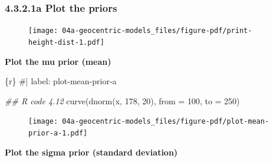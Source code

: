 \documentclass[
  letterpaper,
  DIV=11,
  numbers=noendperiod]{scrreprt}
\newenvironment{Shaded}{\begin{snugshade}}{\end{snugshade}}
\newcommand{\AttributeTok}[1]{\textcolor[rgb]{0.40,0.45,0.13}{#1}}
\newcommand{\CommentTok}[1]{\textcolor[rgb]{0.37,0.37,0.37}{#1}}
\newcommand{\ConstantTok}[1]{\textcolor[rgb]{0.56,0.35,0.01}{#1}}
\newcommand{\DecValTok}[1]{\textcolor[rgb]{0.68,0.00,0.00}{#1}}
\newcommand{\DocumentationTok}[1]{\textcolor[rgb]{0.37,0.37,0.37}{\textit{#1}}}
\newcommand{\FunctionTok}[1]{\textcolor[rgb]{0.28,0.35,0.67}{#1}}
\newcommand{\InformationTok}[1]{\textcolor[rgb]{0.37,0.37,0.37}{#1}}
\newcommand{\NormalTok}[1]{\textcolor[rgb]{0.00,0.23,0.31}{#1}}
\newcommand{\SpecialCharTok}[1]{\textcolor[rgb]{0.37,0.37,0.37}{#1}}
\begin{document}
\hypertarget{a-plot-the-priors}{%
\subsubsection{4.3.2.1a Plot the priors}\label{a-plot-the-priors}}

\begin{Shaded}
\end{Shaded}

\begin{figure}[H]

{\centering \texttt{[image: 04a-geocentric-models\_files/figure-pdf/print-height-dist-1.pdf]}

}

\end{figure}

\textbf{Plot the mu prior (mean)}

\begin{Shaded}
\begin{Highlighting}[]
\InformationTok{\textasciigrave{}\textasciigrave{}\textasciigrave{}\{r\}}
\CommentTok{\#| label: plot{-}mean{-}prior{-}a}

\DocumentationTok{\#\# R code 4.12}
\FunctionTok{curve}\NormalTok{(}\FunctionTok{dnorm}\NormalTok{(x, }\DecValTok{178}\NormalTok{, }\DecValTok{20}\NormalTok{), }\AttributeTok{from =} \DecValTok{100}\NormalTok{, }\AttributeTok{to =} \DecValTok{250}\NormalTok{)}
\InformationTok{\textasciigrave{}\textasciigrave{}\textasciigrave{}}
\end{Highlighting}
\end{Shaded}

\begin{figure}[H]

{\centering \texttt{[image: 04a-geocentric-models\_files/figure-pdf/plot-mean-prior-a-1.pdf]}

}

\end{figure}

\textbf{Plot the sigma prior (standard deviation)}
\end{document}
